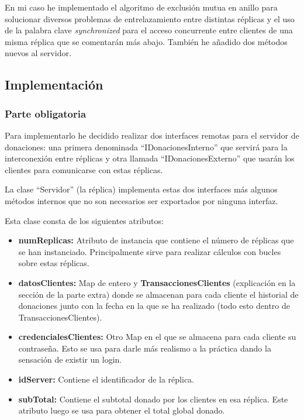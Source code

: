 \documentclass{article}
\begin{document}
En mi caso he implementado el algoritmo de exclusión mutua en anillo para solucionar diversos problemas de entrelazamiento entre distintas réplicas y el uso de la palabra clave \textit{synchronized} para el acceso concurrente entre clientes de una misma réplica que se comentarán más abajo. También he añadido dos métodos nuevos al servidor.
\subsection{Implementación}
\subsubsection{Parte obligatoria}

Para implementarlo he decidido realizar dos interfaces remotas para el servidor de donaciones: una primera denominada ``IDonacionesInterno'' que servirá para la interconexión entre réplicas y otra llamada ``IDonacionesExterno'' que usarán los clientes para comunicarse con estas réplicas.


La clase ``Servidor'' (la réplica) implementa estas dos interfaces más algunos métodos internos que no son necesarios ser exportados por ninguna interfaz.


Esta clase consta de los siguientes atributos:
\begin{itemize}
    \item \textbf{numReplicas: }Atributo de instancia que contiene el número de réplicas que se han instanciado. Principalmente sirve para realizar cálculos con bucles sobre estas réplicas.
    
    \item \textbf{datosClientes: }Map de entero y \textbf{TransaccionesClientes} (explicación en la sección de la parte extra) donde se almacenan para cada cliente el historial de donaciones junto con la fecha en la que se ha realizado (todo esto dentro de TransaccionesClientes).
    \item \textbf{credencialesClientes: }Otro Map en el que se almacena para cada cliente su contraseña. Esto se usa para darle más realismo a la práctica dando la sensación de existir un login.
    \item \textbf{idServer: }Contiene el identificador de la réplica.
    \item \textbf{subTotal: }Contiene el subtotal donado por los clientes en esa réplica. Este atributo luego se usa para obtener el total global donado. 
\end{itemize}
\end{document}
